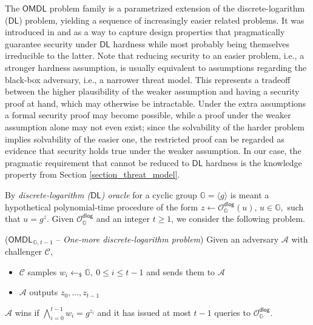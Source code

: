\documentclass{iacrtrans}
\begin{document}
The $\mathsf{OMDL}$ problem family
is a parametrized extension of
the discrete-logarithm ($\mathsf{DL}$) problem,
yielding a sequence of increasingly easier related problems.
It was introduced in
\cite{paper_bellare_palacio} and
\cite{paper_bellare_omdl}
as a way to capture design properties
that pragmatically guarantee security under
$\mathsf{DL}$ hardness
while most probably being themselves irreducible to the latter.
Note that reducing security to an easier problem,
i.e., a stronger hardness assumption,
is usually equivalent to assumptions
regarding the black-box adversary,
i.e., a narrower threat model.
This represents a tradeoff between the higher plausibility
of the weaker assumption
and having a security proof at hand,
which may otherwise be intractable.
Under the extra assumptions
a formal security proof may become possible,
while a proof under the weaker
assumption alone may not even exist;
since the solvability of the harder problem
implies solvability of the easier one,
the restricted proof can be regarded as
evidence that security holds
true under the weaker assumption.
In our case, the pragmatic requirement
that cannot be reduced to $\mathsf{DL}$ hardness
is the knowledge property
from Section \ref{section_threat_model}.

By \textit{discrete-logarithm \textup{($\mathsf{DL}$)} oracle}
for a cyclic group $\mathbb{G} = \langle g \rangle$
is meant a hypothetical polynomial-time procedure of the form
$z \leftarrow \mathcal{O}_{\mathbb{G}}^{\mathsf{dlog}}(u),
\hspace{2pt} u \in \mathbb{G},$
such that
$u = g ^ z$.
Given $\mathcal{O}_{\mathbb{G}}^{\mathsf{dlog}}$
and an integer $t \ge 1$,
we consider the following problem.

\begin{attack_game}\label{omdl_attack}
\vspace{3pt}
($\mathsf{OMDL}_{\hspace{1pt}\mathbb{G},\hspace{1pt} t-1}$ --
\textit{One-more discrete-logarithm problem})
Given an adversary $\mathcal{A}$ with challenger $\mathcal{C}$,\vspace{2pt}
\begin{itemize}[label=$\circ$,leftmargin=17pt]
	\item
		$\mathcal{C}$ samples $w_i \leftarrow_\$ \mathbb{G},
		\ 0 \le i \le t-1$
		and sends them to $\mathcal{A}$\vspace{5pt}
	\item
		$\mathcal{A}$ outputs $z_0, \dots, z_{t-1}$\vspace{2.5pt}
\end{itemize}
\hspace*{0pt}%
\begin{minipage}{\dimexpr\textwidth-\parindent\relax}%
	\hspace{8pt}$\mathcal{A}$ wins if\hspace{0pt}
	$\bigwedge\limits_{i=0}^{t-1} w_i = g^{z_i}$
	and it has issued at most $t-1$ queries to
	$\mathcal{O}_{\mathbb{G}}^{\mathsf{dlog}}$.
\end{minipage}%
\vspace{3.0pt}
\end{attack_game}
\end{document}
